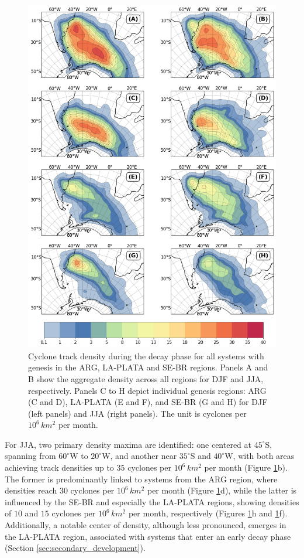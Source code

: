 \begin{figure}[!htbp]
\centering
\includegraphics[width=\textwidth]{figs_4/density_map_decay.png}
\caption[Track Density - Decay Phase]{Cyclone track density during the decay phase for all systems with genesis in the ARG, LA-PLATA and SE-BR regions. Panels A and B show the aggregate density across all regions for DJF and JJA, respectively. Panels C to H depict individual genesis regions: ARG (C and D), LA-PLATA (E and F), and SE-BR (G and H) for DJF (left panels) and JJA (right panels). The unit is cyclones per \(10^6 \, km^2\) per month.}
\label{fig:density_map_decay}
\end{figure}

For JJA, two primary density maxima are identified: one centered at \(45^\circ\)S, spanning from \(60^\circ\)W to \(20^\circ\)W, and another near \(35^\circ\)S and \(40^\circ\)W, with both areas achieving track densities up to \(35\) cyclones per \(10^6 \, km^2\) per month (Figure \ref{fig:density_map_decay}b). The former is predominantly linked to systems from the ARG region, where densities reach \(30\) cyclones per \(10^6 \, km^2\) per month (Figure \ref{fig:density_map_decay}d), while the latter is influenced by the SE-BR and especially the LA-PLATA regions, showing densities of \(10\) and \(15\) cyclones per \(10^6 \, km^2\) per month, respectively (Figures \ref{fig:density_map_decay}h and \ref{fig:density_map_decay}f). Additionally, a notable center of density, although less pronounced, emerges in the LA-PLATA region, associated with systems that enter an early decay phase (Section \ref{sec:secondary_development}). 

